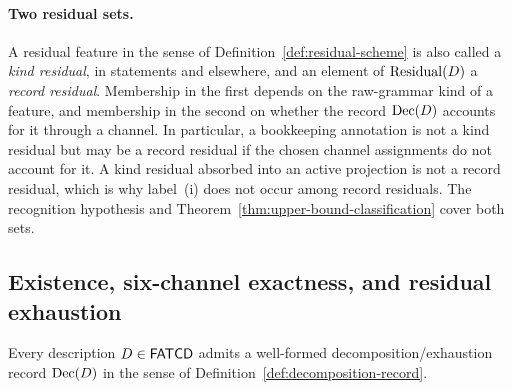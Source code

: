 \paragraph{Two residual sets.} A residual feature in the sense of
Definition~\ref{def:residual-scheme} is also called a \emph{kind residual}, in
statements and elsewhere, and an element of \(\operatorname{Residual}\!\left(D\right)\) a \emph{record
residual}.
Membership in the first depends on the raw-grammar kind of a feature, and
membership in the second on whether the record \(\operatorname{Dec}\!\left(D\right)\) accounts for it
through a channel. In particular, a bookkeeping annotation is not a kind
residual but may be a record residual if the chosen channel assignments do not
account for it. A kind residual absorbed into an active projection is not a
record residual, which is why label~(i) does not occur among record residuals.
The recognition hypothesis and
Theorem~\ref{thm:upper-bound-classification} cover both sets.


\subsection{Existence, six-channel exactness, and residual exhaustion}\label{subsec:dec-theorems}

\begin{theorem}\label{thm:decomposition-existence}
Every description \(D \in \mathsf{FATCD}{}\) admits a well-formed decomposition/exhaustion
record \(\operatorname{Dec}\!\left(D\right)\) in the sense of
Definition~\ref{def:decomposition-record}.
\end{theorem}

